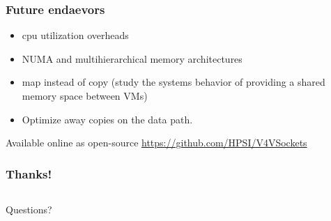 \documentclass[red,slidestop,notes,compress,mathserif]{beamer}
\begin{document}
\begin{frame}
\frametitle{Future endaevors}
\begin{itemize}
\item cpu utilization overheads
\item NUMA and multihierarchical memory architectures
\item map instead of copy (study the systems behavior of providing a shared memory space between VMs)
\item Optimize away copies on the data path.
\end{itemize}

Available online as open-source \url{https://github.com/HPSI/V4VSockets}

\end{frame}
%
\begin{frame}
\frametitle{Thanks!}
                \vfill%
\begin{columns}
        \begin{center}
        \begin{center}
                        {\LARGE Questions?}
        \end{center}
                \vfill%
        \end{center}
\end{columns}
                \vfill%
\end{frame}
\end{document}
